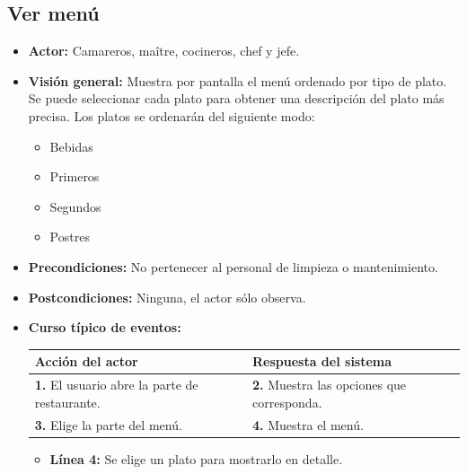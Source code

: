\documentclass[spanish,a4paper,11pt, twoside]{report}	%
\begin{document}
 	
	\subsection{Ver menú}
			\begin{itemize}
			\item \textbf{Actor:} Camareros, maître, cocineros, chef y jefe.
			\item \textbf{Visión general:} Muestra por pantalla el menú ordenado por tipo de
				plato. Se puede seleccionar cada plato para obtener una descripción del plato más
				precisa. Los platos se ordenarán del siguiente modo:
			\begin{itemize}
				\item 	 Bebidas
				\item 	 Primeros
				\item 	 Segundos
				\item 	 Postres
				\end {itemize}
			\item \textbf{Precondiciones:} No pertenecer al personal de limpieza o mantenimiento.
			\item \textbf{Postcondiciones:} Ninguna, el actor sólo observa.
			\item \textbf{Curso típico de eventos:} 	\\
				\begin{tabular}{|p{6cm}||p{6cm}|}
				\hline
				\textbf{Acción del actor} & \textbf{Respuesta del sistema} \\ \hline \hline
				\textbf{1.} El usuario abre la parte de restaurante. & 
				\textbf{2.} Muestra las opciones que corresponda.\\ \hline 
				\textbf{3.} Elige la parte del menú. & 
				\textbf{4.} Muestra el menú. \\ \hline
			\end{tabular}
			\begin{itemize}
				\item  \textbf{Línea 4:} Se elige un plato para mostrarlo en detalle. 
			\end {itemize}
		\end {itemize}



\end{document}
